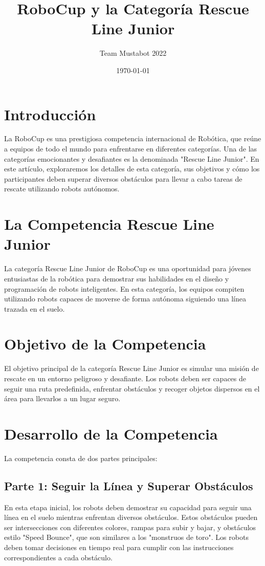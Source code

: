 \documentclass{article}
\title{RoboCup y la Categoría Rescue Line Junior}
\author{Team Mustabot 2022}
\date{\today}
\begin{document}
\maketitle

\section{Introducción}
La RoboCup es una prestigiosa competencia internacional de Robótica, que reúne a equipos de todo el mundo para enfrentarse en diferentes categorías. Una de las categorías emocionantes y desafiantes es la denominada "Rescue Line Junior". En este artículo, exploraremos los detalles de esta categoría, sus objetivos y cómo los participantes deben superar diversos obstáculos para llevar a cabo tareas de rescate utilizando robots autónomos.

\section{La Competencia Rescue Line Junior}
La categoría Rescue Line Junior de RoboCup es una oportunidad para jóvenes entusiastas de la robótica para demostrar sus habilidades en el diseño y programación de robots inteligentes. En esta categoría, los equipos compiten utilizando robots capaces de moverse de forma autónoma siguiendo una línea trazada en el suelo.

\section{Objetivo de la Competencia}
El objetivo principal de la categoría Rescue Line Junior es simular una misión de rescate en un entorno peligroso y desafiante. Los robots deben ser capaces de seguir una ruta predefinida, enfrentar obstáculos y recoger objetos dispersos en el área para llevarlos a un lugar seguro.

\section{Desarrollo de la Competencia}
La competencia consta de dos partes principales:

\subsection{Parte 1: Seguir la Línea y Superar Obstáculos}
En esta etapa inicial, los robots deben demostrar su capacidad para seguir una línea en el suelo mientras enfrentan diversos obstáculos. Estos obstáculos pueden ser intersecciones con diferentes colores, rampas para subir y bajar, y obstáculos estilo "Speed Bounce", que son similares a los "monstruos de toro". Los robots deben tomar decisiones en tiempo real para cumplir con las instrucciones correspondientes a cada obstáculo.
\end{document}
